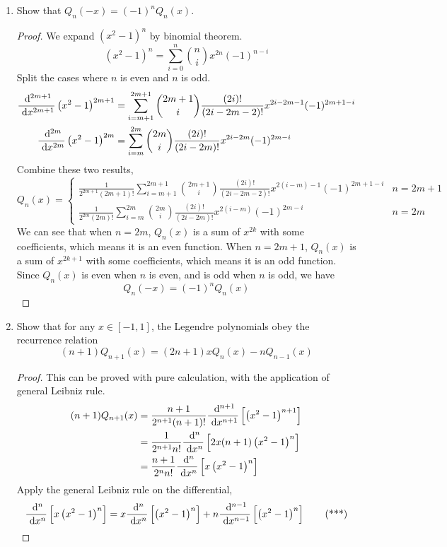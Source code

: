 \begin{enumerate}
\begin{proof}
	Then we conclude that
	\[ \int_{-1}^{1}Q_n(x)Q_k(x)\ud x=0 \]
	So the mutual orthogonality is also proved.
	\end{proof}
	\item Show that \(Q_n(-x)=(-1)^n Q_n(x)\).
	\begin{proof}
	We expand \(\left(x^2-1\right)^n\) by binomial theorem.
	\[ \left(x^2-1\right)^n=\sum_{i=0}^{n}\binom{n}{i}x^{2n}(-1)^{n-i} \]
	Split the cases where $n$ is even and $n$ is odd.
	\begin{align*}
	\frac{~\mathrm{d}^{2m+1}}{~\mathrm{d}{x}^{2m+1}}\left(x^2-1\right)^{2m+1}&=\sum_{i=m+1}^{2m+1}\binom{2m+1}{i}\frac{(2i)!}{(2i-2m-2)!}x^{2i-2m-1}(-1)^{2m+1-i}\\
	\frac{~\mathrm{d}^{2m}}{~\mathrm{d}{x}^{2m}}\left(x^2-1\right)^{2m}&=\sum_{i=m}^{2m}\binom{2m}{i}\frac{(2i)!}{(2i-2m)!}x^{2i-2m}(-1)^{2m-i}
	\end{align*}
	Combine these two results,
	\[ Q_n(x)=\begin{cases} \frac{1}{2^{2m+1}(2m+1)!} \sum_{i=m+1}^{2m+1}\binom{2m+1}{i}\frac{(2i)!}{(2i-2m-2)!}x^{2(i-m)-1}(-1)^{2m+1-i} & n=2m+1 \\
	\frac{1}{2^{2m}(2m)!}\sum_{i=m}^{2m}\binom{2m}{i}\frac{(2i)!}{(2i-2m)!}x^{2(i-m)}(-1)^{2m-i} & n=2m \end{cases} \]
	We can see that when \(n=2m\), \(Q_n(x)\) is a sum of \(x^{2k}\) with some coefficients, which means it is an even function.
	When \(n=2m+1\), \(Q_n(x)\) is a sum of \(x^{2k+1}\) with some coefficients, which means it is an odd function.
	Since \(Q_n(x)\) is even when $n$ is even, and is odd when $n$ is odd, we have
	\[ Q_n(-x)=(-1)^n Q_n(x) \]
	\end{proof}
	\item Show that for any \(x \in [-1, 1]\), the Legendre polynomials obey the recurrence relation
	\[ (n + 1)Q_{n+1}(x) = (2n + 1)x Q_n(x) - n Q_{n-1}(x) \]
	\begin{proof}
	This can be proved with pure calculation, with the application of general Leibniz rule.
	\begin{align*}
		(n+1)Q_{n+1}(x)&=\frac{n+1}{2^{n+1}(n+1)!}\frac{~\mathrm{d}^{n+1}}{~\mathrm{d}{x}^{n+1}}\left[\left(x^2-1\right)^{n+1}\right]\\
		&=\frac{1}{2^{n+1}n!}\frac{~\mathrm{d}^{n}}{~\mathrm{d}{x}^{n}}\left[2x(n+1)\left(x^2-1\right)^{n}\right]\\
		&=\frac{n+1}{2^{n}n!}\frac{~\mathrm{d}^{n}}{~\mathrm{d}{x}^{n}}\left[x\left(x^2-1\right)^{n}\right]
	\end{align*}
	Apply the general Leibniz rule on the differential,
	\[ \frac{~\mathrm{d}^{n}}{~\mathrm{d}{x}^{n}}\left[x\left(x^2-1\right)^{n}\right]=x\frac{~\mathrm{d}^{n}}{~\mathrm{d}{x}^{n}}\left[\left(x^2-1\right)^{n}\right]+n\frac{~\mathrm{d}^{n-1}}{~\mathrm{d}{x}^{n-1}}\left[\left(x^2-1\right)^{n}\right] \tag{***} \]

\end{proof}
\end{enumerate}
